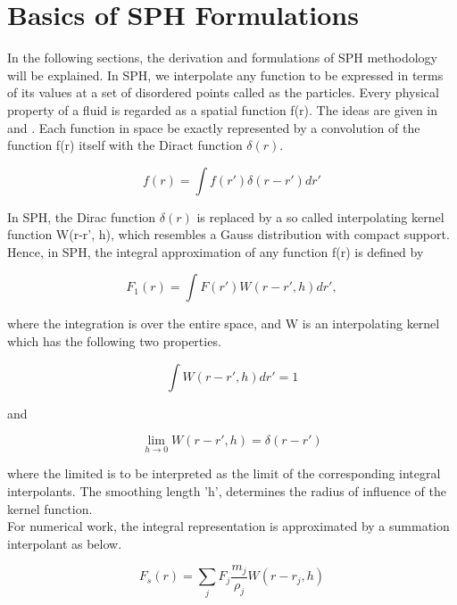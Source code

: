 
\chapter{Basics of SPH Formulations}

In the following sections, the derivation and formulations of SPH methodology will be explained.
In SPH, we interpolate any function to be expressed in terms of its values at a set of disordered points called as the particles.
Every physical property of a fluid is regarded as a spatial function f(r). 
The ideas are given in \cite{Monaghan1977} and \cite{Lucy}. 
Each function in space be exactly represented by a convolution of the function f(r) itself with the Diract function $\delta (r)$.

\begin{equation}
 f(r) = \int f(r')\delta(r - r')dr'
\end{equation}

In SPH, the Dirac function $\delta (r)$ is replaced by a so called interpolating kernel function W(r-r', h), which resembles a Gauss distribution with compact support. Hence, in SPH, the integral approximation of any function f(r) is defined by

\begin{equation}
 F_1 (r) = \int F(r') W(r-r', h) dr' ,
\end{equation}

\noindent
where the integration is over the entire space, and W is an interpolating kernel which has the following two properties.

\begin{equation}
 \int W(r-r', h)dr' = 1
\end{equation}

\noindent
and 

\begin{equation}
 \lim_{h\to0} W(r-r', h) = \delta(r-r')
\end{equation}

\noindent
where the limited is to be interpreted as the limit of the corresponding integral interpolants. The smoothing length 'h', determines the radius of influence of the kernel function. \\

For numerical work, the integral representation is approximated by a summation interpolant as below.

\begin{equation}
 F_s (r) = \sum_{j} F_j \frac{m_j}{\rho_j} W(r-r_j, h)
 \label{interpolation}
\end{equation}

